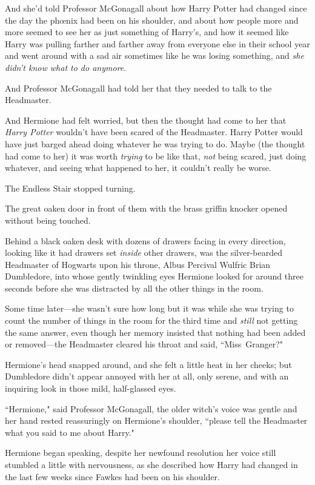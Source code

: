 And she'd told Professor McGonagall about how Harry Potter had changed since the day the phœnix had been on his shoulder, and about how people more and more seemed to see her as just something of Harry's, and how it seemed like Harry was pulling farther and farther away from everyone else in their school year and went around with a sad air sometimes like he was losing something, and \emph{she didn't know what to do anymore}.

And Professor McGonagall had told her that they needed to talk to the Headmaster.

And Hermione had felt worried, but then the thought had come to her that \emph{Harry Potter} wouldn't have been scared of the Headmaster. Harry Potter would have just barged ahead doing whatever he was trying to do. Maybe (the thought had come to her) it was worth \emph{trying} to be like that, \emph{not} being scared, just doing whatever, and seeing what happened to her, it couldn't really be worse.

The Endless Stair stopped turning.

The great oaken door in front of them with the brass griffin knocker opened without being touched.

Behind a black oaken desk with dozens of drawers facing in every direction, looking like it had drawers set \emph{inside} other drawers, was the silver-bearded Headmaster of Hogwarts upon his throne, Albus Percival Wulfric Brian Dumbledore, into whose gently twinkling eyes Hermione looked for around three seconds before she was distracted by all the other things in the room.

Some time later—she wasn't sure how long but it was while she was trying to count the number of things in the room for the third time and \emph{still} not getting the same answer, even though her memory insisted that nothing had been added or removed—the Headmaster cleared his throat and said, ``Miss~Granger?"

Hermione's head snapped around, and she felt a little heat in her cheeks; but Dumbledore didn't appear annoyed with her at all, only serene, and with an inquiring look in those mild, half-glassed eyes.

``Hermione," said Professor McGonagall, the older witch's voice was gentle and her hand rested reassuringly on Hermione's shoulder, ``please tell the Headmaster what you said to me about Harry."

Hermione began speaking, despite her newfound resolution her voice still stumbled a little with nervousness, as she described how Harry had changed in the last few weeks since Fawkes had been on his shoulder.

